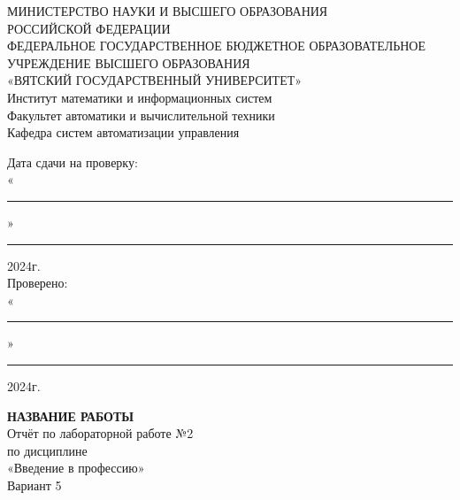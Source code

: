 \documentclass[a4paper, 10pt]{article}
\begin{document}
\vspace{10cm}
\begin{center}
  {\large
    МИНИСТЕРСТВО НАУКИ И ВЫСШЕГО ОБРАЗОВАНИЯ\\ РОССИЙСКОЙ ФЕДЕРАЦИИ \\
    \vspace{10px}
    ФЕДЕРАЛЬНОЕ ГОСУДАРСТВЕННОЕ БЮДЖЕТНОЕ ОБРАЗОВАТЕЛЬНОЕ УЧРЕЖДЕНИЕ ВЫСШЕГО ОБРАЗОВАНИЯ \\
    «ВЯТСКИЙ ГОСУДАРСТВЕННЫЙ УНИВЕРСИТЕТ»
    \\
    \vspace{10px}
    Институт математики и информационных систем\\
    \vspace{10px}
    Факультет автоматики и вычислительной техники\\
    \vspace{10px}
    Кафедра систем автоматизации управления
  }
\end{center}
\vspace{6\baselineskip}
\begin{flushright}
  
  Дата сдачи на проверку:\\
  \vspace{10px}
  «\rule[0px]{10px}{0.5px}»\rule[0px]{65px}{0.5px} 2024г.\\
  \vspace{5px}
  Проверено:~~~~~~~~~~~~~~~~~~~\\
  \vspace{10px}
  «\rule[0px]{10px}{0.5px}»\rule[0px]{65px}{0.5px} 2024г.

\end{flushright}
\vspace{2\baselineskip}
\begin{center}
  {\large
    \textbf {НАЗВАНИЕ РАБОТЫ}\\
    \vspace{10px}
    Отчёт по лабораторной работе №2 \\ по дисциплине\\
    \vspace{10px}
    «Введение в профессию»\\
    \vspace{10px}
    Вариант 5
  }
\end{center}
\vspace{4\baselineskip}
\end{document}

